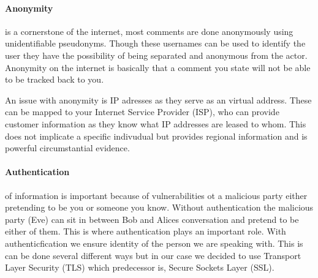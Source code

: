\paragraph{Anonymity}
is a cornerstone of the internet, most comments are done anonymously
using unidentifiable pseudonyms. Though these usernames can be used to
identify the user they have the possibility of being separated and
anonymous from the actor. Anonymity on the internet is basically that
a comment you state will not be able to be tracked back to you.

An issue with anonymity is IP adresses as they serve as an virtual
address. These can be mapped to your Internet Service Provider (ISP),
who can provide customer information as they know what IP addresses
are leased to whom. This does not implicate a specific indivudual but
provides regional information and is powerful circumstantial
evidence.

\paragraph{Authentication}of information is important because of
vulnerabilities ot a malicious party either pretending to be you or
someone you know. Without authentication the malicious party (Eve) can
sit in between Bob and Alices conversation and pretend to be either of
them. This is where authentication plays an important role. With
authenticfication we ensure identity of the person we are speaking
with. This is can be done several different ways but in our case we
decided to use Transport Layer Security (TLS) which predecessor is,
Secure Sockets Layer (SSL).
